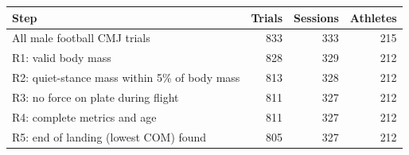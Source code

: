 \begin{tabular}{lrrr}
\toprule
Step & Trials & Sessions & Athletes \\
\midrule
All male football CMJ trials & 833 & 333 & 215 \\
R1: valid body mass & 828 & 329 & 212 \\
R2: quiet-stance mass within 5\% of body mass & 813 & 328 & 212 \\
R3: no force on plate during flight & 811 & 327 & 212 \\
R4: complete metrics and age & 811 & 327 & 212 \\
R5: end of landing (lowest COM) found & 805 & 327 & 212 \\
\bottomrule
\end{tabular}
